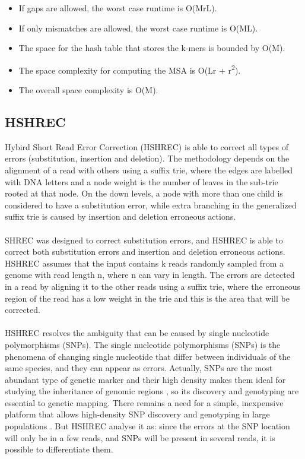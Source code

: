 \documentclass[12pt,openany]{llncs}
\begin{document}
\begin{itemize}
	\item If gaps are allowed, the worst case runtime is O(MrL).
	\item If only mismatches are allowed, the worst case runtime is O(ML).
	\item The space for the hash table that stores the k-mers is bounded by O(M).
	\item The space complexity for computing the MSA is O(Lr + r\textsuperscript{2}).
	\item The overall space complexity is O(M).
\end{itemize}

\subsection{HSHREC}
Hybird Short Read Error Correction (HSHREC) \cite{HShrec} is able to correct all types of errors (substitution, insertion and deletion). The methodology depends on the alignment of a read with others using a suffix trie, where the edges are labelled with DNA letters and a node weight is the number of leaves in the sub-trie rooted at that node. On the down levels, a node with more than one child is considered to have a substitution error, while extra branching in the generalized suffix trie is caused by insertion and deletion erroneous actions.
\\
\\
SHREC was designed to correct substitution errors, and HSHREC is able to correct both substitution errors and insertion and deletion erroneous actions.
\\
HSHREC assumes that the input contains k reads randomly sampled from a genome with read length n, where n can vary in length. The errors are detected in a read by aligning it to the other reads using a suffix trie, where the erroneous region of the read has a low weight in the trie and this is the area that will be corrected.
\\
\\
HSHREC resolves the ambiguity that can be caused by single nucleotide polymorphisms (SNPs). The single nucleotide polymorphisms (SNPs) is the phenomena of changing single nucleotide that differ between individuals of the same species, and they can appear as errors. Actually, SNPs are the most abundant type of genetic marker and their high density makes them ideal for studying the inheritance of genomic regions \cite{SNP1,SNP2}, so its discovery and genotyping are essential to genetic mapping. There remains a need for a simple, inexpensive platform that allows high-density SNP discovery and genotyping in large populations \cite{SNP3}. But HSHREC analyse it as: since the errors at the SNP location will only be in a few reads, and SNPs will be present in several reads, it is possible to differentiate them.
\end{document}
